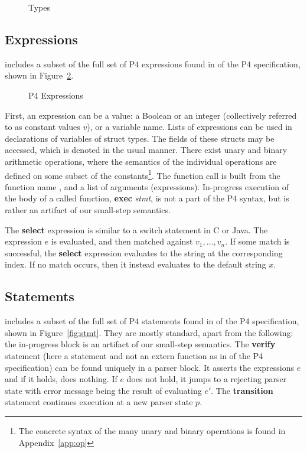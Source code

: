 \documentclass[UTF8]{article}
\begin{document}
\begin{figure}[h!]
\centering\ottgrammartabular{
\ottbt\ottinterrule
\ottt\ottinterrule
}
\caption{Types}
\label{fig:types}
\end{figure}

\newpage
\subsection{Expressions}
\newcommand{\fmap}{\textit{F}}

\pfott{} includes a subset of the full set of P4 expressions found in {} of the P4 specification, shown in Figure~\ref{fig:exp}.

\begin{figure}[h!]
\centering\ottgrammartabular{
\otte\ottafterlastrule
}
\caption{P4 Expressions}
\label{fig:exp}
\end{figure}
\newcommand{\stmt}{\textit{stmt}}
\newcommand{\cval}{\ensuremath{v}}
\newcommand{\fexec}[1]{\textbf{exec}\,\,#1}

First, an expression can be a value: a Boolean or an integer (collectively referred to as constant values \cval{}), or a variable name. Lists of expressions can be used in declarations of variables of struct types. The fields of these structs may be accessed, which is denoted in the usual manner. There exist unary and binary arithmetic operations, where the semantics of the individual operations are defined on some subset of the constants\footnote{The concrete syntax of the many unary and binary operations is found in Appendix~\ref{app:op}}. The function call is built from the function name \fn{}, and a list of arguments (expressions). In-progress execution of the body of a called function, \fexec{\stmt{}}, is not a part of the P4 syntax, but is rather an artifact of our small-step semantics.

The \textbf{select} expression is similar to a switch statement in C or Java. The expression $e$ is evaluated, and then matched against $v_1 , \ldots , v_n$. If some match is successful, the \textbf{select} expression evaluates to the string at the corresponding index. If no match occurs, then it instead evaluates to the default string $x$.

\newpage
\subsection{Statements}

\label{ssec:stmt}
\pfott{} includes a subset of the full set of P4 statements found in  of the P4 specification, shown in Figure~\ref{fig:stmt}. They are mostly standard, apart from the following: the in-progress block is an artifact of our small-step semantics. The \textbf{verify} statement (here a statement and not an extern function as in  of the P4 specification) can be found uniquely in a parser block. It asserts the expressions $e$ and if it holds, does nothing. If $e$ does not hold, it jumps to a rejecting parser state with error message being the result of evaluating $e'$. The \textbf{transition} statement continues execution at a new parser state $p$.
\end{document}
